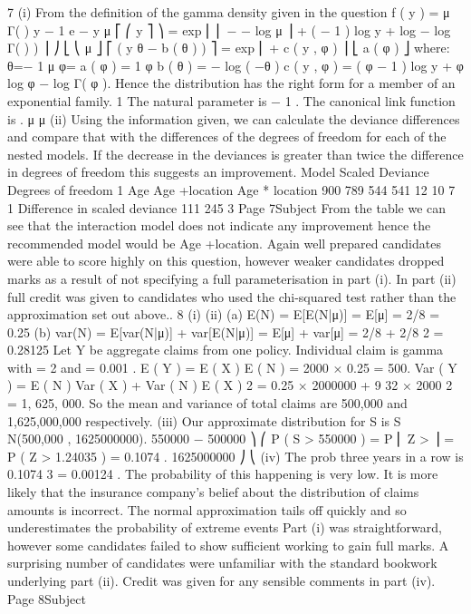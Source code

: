 7
(i)
From the definition of the gamma density given in the question
f ( y ) =
\alpha \alpha
μ \alpha Γ( \alpha )
y
\alpha− 1
e
\alpha
− y
μ
⎡ ⎛ y
⎤
⎞
= exp ⎢ ⎜ − − log μ ⎟ \alpha + ( \alpha − 1 ) log y + \alpha log \alpha − log Γ( \alpha ) ) ⎥
⎠
⎣ ⎝ μ
⎦
⎡ ( y θ − b ( θ ) )
⎤
= exp ⎢
+ c ( y , φ ) ⎥
⎣ a ( φ )
⎦
where:
θ=−
1
μ
φ=\alpha
a ( φ ) =
1
φ
b ( θ ) = − log ( −θ )
c ( y , φ ) = ( φ − 1 ) log y + φ log φ − log Γ( φ ).
Hence the distribution has the right form for a member of an exponential
family.
1
The natural parameter is − 1 . The canonical link function is .
μ
μ
(ii)
Using the information given, we can calculate the deviance differences and
compare that with the differences of the degrees of freedom for each of the
nested models. If the decrease in the deviances is greater than twice the
difference in degrees of freedom this suggests an improvement.
Model Scaled
Deviance Degrees of
freedom
1
Age
Age +location
Age * location 900
789
544
541 12
10
7
1
Difference
in scaled
deviance
111
245
3
Page 7Subject %
From the table we can see that the interaction model does not indicate any
improvement hence the recommended model would be Age +location.
Again well prepared candidates were able to score highly on this question, however weaker
candidates dropped marks as a result of not specifying a full parameterisation in part (i). In
part (ii) full credit was given to candidates who used the chi-squared test rather than the
approximation set out above..
8
(i)
(ii)
(a) E(N) = E[E(N|μ)]
= E[μ] = 2/8 = 0.25
(b) var(N) = E[var(N|μ)] + var[E(N|μ)]
= E[μ] + var[μ]
= 2/8 + 2/8 2 = 0.28125
Let Y be aggregate claims from one policy.
Individual claim is gamma with \alpha = 2 and \lambda = 0.001 .
E ( Y ) = E ( X ) E ( N ) = 2000 × 0.25 = 500.
Var ( Y ) = E ( N ) Var ( X ) + Var ( N ) E ( X ) 2
= 0.25 × 2000000 + 9
32
× 2000 2 = 1, 625, 000.
So the mean and variance of total claims are 500,000 and 1,625,000,000
respectively.
(iii)
Our approximate distribution for S is S ~ N(500,000 , 1625000000).
550000 − 500000 ⎞
⎛
P ( S > 550000 ) = P ⎜ Z >
⎟ = P ( Z > 1.24035 ) = 0.1074 .
1625000000 ⎠
⎝
(iv)
The prob three years in a row is 0.1074 3 = 0.00124 .
The probability of this happening is very low. It is more likely that the
insurance company’s belief about the distribution of claims amounts is
incorrect.
The normal approximation tails off quickly and so underestimates the
probability of extreme events
Part (i) was straightforward, however some candidates failed to show sufficient working to
gain full marks. A surprising number of candidates were unfamiliar with the standard
bookwork underlying part (ii). Credit was given for any sensible comments in part (iv).
Page 8Subject %
